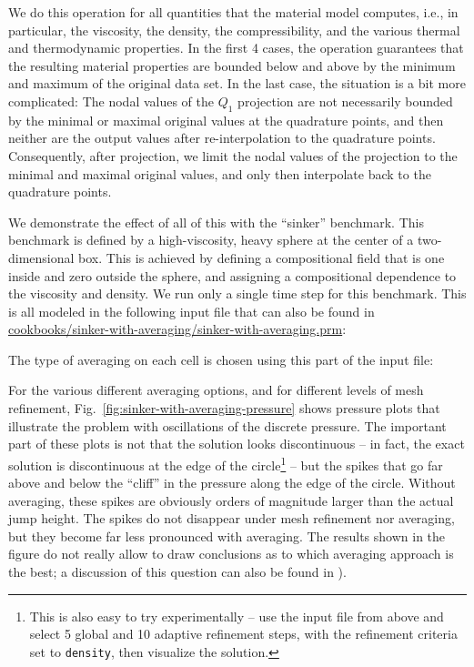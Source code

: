 \documentclass{article}
\begin{document}
We do this operation for all quantities that the material model computes,
i.e., in particular, the viscosity, the density, the compressibility, and the
various thermal and thermodynamic properties. In the first 4 cases, the
operation guarantees that the resulting material properties are bounded below
and above by the minimum and maximum of the original data set. In the last
case, the situation is a bit more complicated: The nodal values of the $Q_1$
projection are not necessarily bounded by the minimal or maximal original
values at the quadrature points, and then neither are the output values after
re-interpolation to the quadrature points. Consequently, after projection, we
limit the nodal values of the projection to the minimal and maximal original
values, and only then interpolate back to the quadrature points.

We demonstrate the effect of all of this with the ``sinker'' benchmark. This
benchmark is defined by a high-viscosity, heavy sphere at the center of a
two-dimensional box. This is achieved by defining a compositional field that is
one inside and zero outside the sphere, and assigning a compositional dependence
to the viscosity and density. We run only a single time step for this benchmark.
This is all modeled in the following input file that can also be found in
\url{cookbooks/sinker-with-averaging/sinker-with-averaging.prm}:


The type of averaging on each cell is chosen using this part of the input file:

For the various different averaging options, and for different levels of mesh
refinement, Fig.~\ref{fig:sinker-with-averaging-pressure} shows
pressure plots that illustrate the problem with oscillations of the discrete
pressure. The important part of these plots is not that the solution looks
discontinuous -- in fact, the exact solution is discontinuous at the edge of the
circle\footnote{This is also easy to try experimentally -- use the input file
from above and select 5 global and 10 adaptive refinement steps, with the
refinement criteria set to \texttt{density}, then visualize the solution.} --
but the spikes that go far above and below the ``cliff'' in the pressure along
the edge of the circle. Without averaging, these spikes are obviously orders
of magnitude larger than the actual jump height. The spikes do not disappear
under mesh refinement nor averaging, but they become far less pronounced with
averaging. The results shown in the figure do not really allow to draw
conclusions as to which averaging approach is the best; a discussion of this
question can also be found in \cite{Bab08,Deu08,DMGT11,TMK14}).
\end{document}
